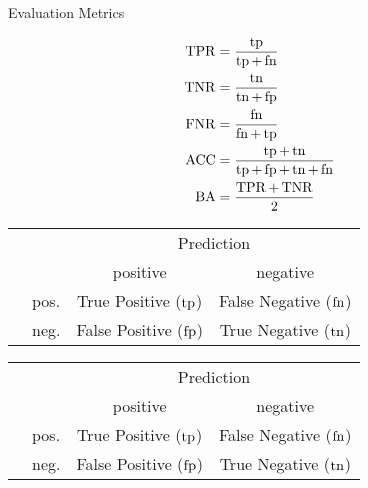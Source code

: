 \begin{frame}{Evaluation Metrics}
    \begin{minipage}{0.48\textwidth}
        \begin{align*}
            \operatorname{TPR} &= \frac{\operatorname{tp}}{\operatorname{tp} + \operatorname{fn}} \\
            \operatorname{TNR} &= \frac{\operatorname{tn}}{\operatorname{tn} + \operatorname{fp}} \\
            \operatorname{FNR} &= \frac{\operatorname{fn}}{\operatorname{fn} + \operatorname{tp}} \\
            \operatorname{ACC} &= \frac{\operatorname{tp} + \operatorname{tn}}{\operatorname{tp} + \operatorname{fp} + \operatorname{tn} + \operatorname{fn}} \\
            \operatorname{BA} &= \frac{\operatorname{TPR} + \operatorname{TNR}}{2}
        \end{align*}
    \end{minipage}
    \begin{minipage}{0.48\textwidth}
            {%
            \begin{table}
                \centering
                \begin{tabular}{r l c c}
                    & & \multicolumn{2}{c}{Prediction} \\
                    & & positive & negative \\
                    \parbox[t]{2mm}{} &  pos. & \colorbox{darkmode!92!white}{True Positive ($\operatorname{tp}$)} & False Negative ($\operatorname{fn}$) \\
                    & neg. & False Positive ($\operatorname{fp}$) & \colorbox{darkmode!92!white}{True Negative ($\operatorname{tn}$)} \\
                \end{tabular}
            \end{table}%
            }
            {%
            \begin{table}
                \centering
                \begin{tabular}{r l c c}
                    & & \multicolumn{2}{c}{Prediction} \\
                    & & positive & negative \\
                    \parbox[t]{2mm}{} &  pos. & \colorbox{white!92!black}{True Positive ($\operatorname{tp}$)} & False Negative ($\operatorname{fn}$) \\
                    & neg. & False Positive ($\operatorname{fp}$) & \colorbox{white!92!black}{True Negative ($\operatorname{tn}$)} \\
                \end{tabular}
            \end{table}%
            }
    \end{minipage}
\end{frame}

